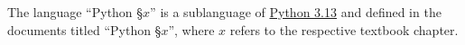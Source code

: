 The language ``Python \S $x$'' is a sublanguage of 
\href{https://docs.python.org/3/index.html}{\color{DarkBlue}
Python 3.13} 
and defined in the documents titled ``Python \S $x$'', where $x$ refers to the
respective textbook chapter.
